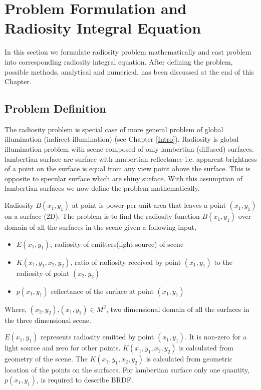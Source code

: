 
\chapter{\label{ch:problemformulation}Problem Formulation and Radiosity Integral Equation}

In this section we formulate radiosity problem mathematically and cast problem into corresponding radiosity integral equation. After defining the problem, possible methods, analytical and numerical, has been discussed at the end of this Chapter.


\section{\label{problemformulation}Problem Definition}
The radiosity problem is special case of more general problem of global illumination (indirect illumination) (see Chapter \ref{Intro}). Radiosity is global illumination problem with scene composed of only lambertian (diffused) surfaces. lambertian surface are surface with lambertian reflectance i.e. apparent brightness of a point on the surface is equal from any view point above the surface. This is opposite to specular surface which are shiny surface. With this assumption of lambertian surfaces we now define the problem mathematically.

Radiosity $B(x_1,y_1)$ at point is power per unit area that leaves a point $(x_1,y_1)$ on a surface (2D). The problem is to find the radiosity function  $B(x_1,y_1)$ over domain of all the surfaces in the scene given a following input,
\begin{itemize}
\item $E(x_1,y_1)$, radiosity of emitters(light source) of scene
\item $K(x_1,y_1,x_2,y_2)$, ratio of radiosity received by point $(x_1,y_1)$ to the radiosity of  point $(x_2,y_2)$\\
\item $p(x_1,y_1)$ reflectance of the surface at point $(x_1,y_1)$\\

\end{itemize}
Where, $(x_2,y_2)$,$(x_1,y_1)  \in  M^2$, two dimensional domain of all the surfaces in the  three dimensional scene.

$E(x_1,y_1)$ represents radiosity emitted by point $(x_1,y_1)$. It is non-zero for a light source and zero for other points. $K(x_1,y_1,x_2,y_2)$ is calculated from geometry of the scene. The $K(x_1,y_1,x_2,y_2)$ is calculated from geometric location of the  points on the surfaces. For lambertian surface only one quantity,  $p(x_1,y_1)$, is required to describe BRDF.

